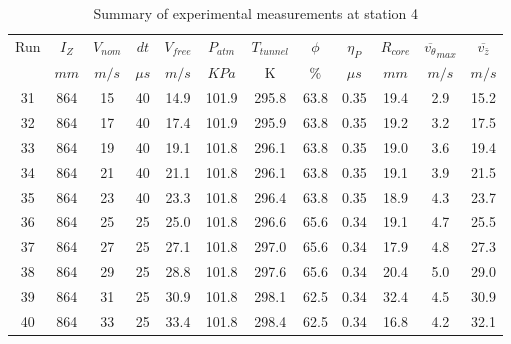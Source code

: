 \begin{table}[H]
\begin{center}
\begin{tabular}{|cccccccccccc|}
	\hline
	Run & $I_Z$ & $V_{nom}$ & $dt$ & $V_{free}$ & $P_{atm}$ & $T_{tunnel}$ & $\phi$ & $\eta_P$ & $R_{core}$ & $\overline{v_{\theta}}_{max}$ & $\overline{v_{\bar{z}}}$\\
	  & $mm$ & $m/s$ & $\mu s$ & $m/s$ & $KPa$ & K & $\%$ & $\mu s$ & $mm$ & $m/s$ & $m/s$\\
	\hline
	31 & 864 & 15 & 40 & 14.9 & 101.9 & 295.8 & 63.8 & 0.35 & 19.4 & 2.9 & 15.2\\
	32 & 864 & 17 & 40 & 17.4 & 101.9 & 295.9 & 63.8 & 0.35 & 19.2 & 3.2 & 17.5\\
	33 & 864 & 19 & 40 & 19.1 & 101.8 & 296.1 & 63.8 & 0.35 & 19.0 & 3.6 & 19.4\\
	34 & 864 & 21 & 40 & 21.1 & 101.8 & 296.1 & 63.8 & 0.35 & 19.1 & 3.9 & 21.5\\
	35 & 864 & 23 & 40 & 23.3 & 101.8 & 296.4 & 63.8 & 0.35 & 18.9 & 4.3 & 23.7\\
	36 & 864 & 25 & 25 & 25.0 & 101.8 & 296.6 & 65.6 & 0.34 & 19.1 & 4.7 & 25.5\\
	37 & 864 & 27 & 25 & 27.1 & 101.8 & 297.0 & 65.6 & 0.34 & 17.9 & 4.8 & 27.3\\
	38 & 864 & 29 & 25 & 28.8 & 101.8 & 297.6 & 65.6 & 0.34 & 20.4 & 5.0 & 29.0\\
	39 & 864 & 31 & 25 & 30.9 & 101.8 & 298.1 & 62.5 & 0.34 & 32.4 & 4.5 & 30.9\\
	40 & 864 & 33 & 25 & 33.4 & 101.8 & 298.4 & 62.5 & 0.34 & 16.8 & 4.2 & 32.1\\
	\hline
\end{tabular}
\caption{Summary of experimental measurements at station 4}
\label{table:experiment_results_4}
\end{center}
\end{table}
